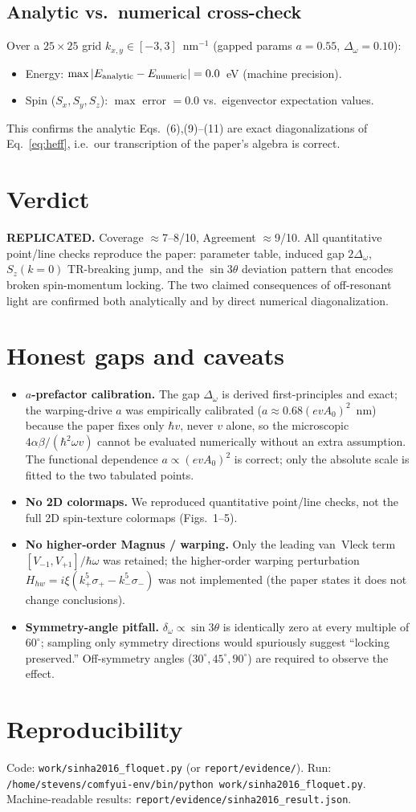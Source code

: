 \documentclass[11pt]{article}
\newcommand{\hv}{\hbar v}
\newcommand{\dw}{\Delta_\omega}
\begin{document}
\subsection{Analytic vs.\ numerical cross-check}
Over a $25\times25$ grid $k_{x,y}\in[-3,3]$~nm$^{-1}$ (gapped params $a=0.55$,
$\dw=0.10$):
\begin{itemize}
  \item Energy: $\max|E_{\rm analytic}-E_{\rm numeric}| = 0.0$~eV (machine precision).
  \item Spin ($S_x,S_y,S_z$): $\max$ error $= 0.0$ vs.\ eigenvector expectation values.
\end{itemize}
This confirms the analytic Eqs.~(6),(9)--(11) are exact diagonalizations of
Eq.~\eqref{eq:heff}, i.e.\ our transcription of the paper's algebra is correct.

\section{Verdict}
\textbf{REPLICATED.} Coverage $\approx$7--8/10, Agreement $\approx$9/10. All
quantitative point/line checks reproduce the paper: parameter table, induced gap
$2\dw$, $S_z(k{=}0)$ TR-breaking jump, and the $\sin 3\theta$ deviation pattern
that encodes broken spin-momentum locking. The two claimed consequences of
off-resonant light are confirmed both analytically and by direct numerical
diagonalization.

\section{Honest gaps and caveats}\label{sec:gaps}
\begin{itemize}
  \item \textbf{$a$-prefactor calibration.} The gap $\dw$ is derived first-principles
    and exact; the warping-drive $a$ was empirically calibrated
    ($a\approx0.68(evA_0)^2$~nm) because the paper fixes only $\hv$, never $v$
    alone, so the microscopic $4\alpha\beta/(\hbar^2\omega v)$ cannot be evaluated
    numerically without an extra assumption. The functional dependence
    $a\propto(evA_0)^2$ is correct; only the absolute scale is fitted to the two
    tabulated points.
  \item \textbf{No 2D colormaps.} We reproduced quantitative point/line checks,
    not the full 2D spin-texture colormaps (Figs.~1--5).
  \item \textbf{No higher-order Magnus / warping.} Only the leading van~Vleck term
    $[V_{-1},V_{+1}]/\hbar\omega$ was retained; the higher-order warping
    perturbation $H_{hw}=i\xi(k_+^5\sigma_+-k_-^5\sigma_-)$ was not implemented
    (the paper states it does not change conclusions).
  \item \textbf{Symmetry-angle pitfall.} $\delta_\omega\propto\sin 3\theta$ is
    identically zero at every multiple of $60^\circ$; sampling only symmetry
    directions would spuriously suggest ``locking preserved.'' Off-symmetry
    angles ($30^\circ,45^\circ,90^\circ$) are required to observe the effect.
\end{itemize}

\section*{Reproducibility}
Code: \texttt{work/sinha2016\_floquet.py} (or \texttt{report/evidence/}).
Run: \verb|/home/stevens/comfyui-env/bin/python work/sinha2016_floquet.py|.
Machine-readable results: \texttt{report/evidence/sinha2016\_result.json}.
\end{document}
